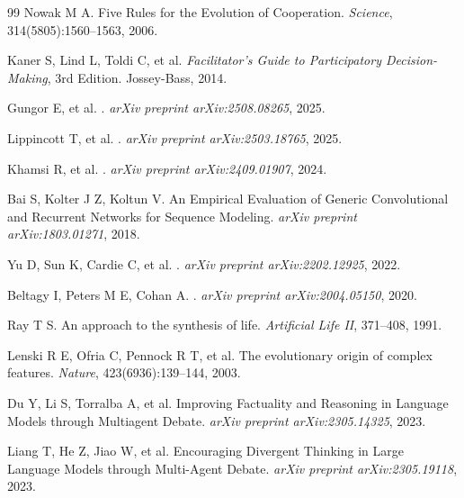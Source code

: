 \documentclass[12pt,a4paper]{ctexart}
\begin{document}
\begin{thebibliography}{99}
Nowak M A.
\newblock Five Rules for the Evolution of Cooperation.
\newblock \emph{Science}, 314(5805):1560--1563, 2006.

Kaner S, Lind L, Toldi C, et al.
\newblock \emph{Facilitator's Guide to Participatory Decision-Making}, 3rd Edition.
\newblock Jossey-Bass, 2014.

Gungor E, et al.
.
\newblock \emph{arXiv preprint arXiv:2508.08265}, 2025.

Lippincott T, et al.
.
\newblock \emph{arXiv preprint arXiv:2503.18765}, 2025.

Khamsi R, et al.
.
\newblock \emph{arXiv preprint arXiv:2409.01907}, 2024.

Bai S, Kolter J Z, Koltun V.
\newblock An Empirical Evaluation of Generic Convolutional and Recurrent Networks for Sequence Modeling.
\newblock \emph{arXiv preprint arXiv:1803.01271}, 2018.

Yu D, Sun K, Cardie C, et al.
.
\newblock \emph{arXiv preprint arXiv:2202.12925}, 2022.

Beltagy I, Peters M E, Cohan A.
.
\newblock \emph{arXiv preprint arXiv:2004.05150}, 2020.

Ray T S.
\newblock An approach to the synthesis of life.
\newblock \emph{Artificial Life II}, 371--408, 1991.

Lenski R E, Ofria C, Pennock R T, et al.
\newblock The evolutionary origin of complex features.
\newblock \emph{Nature}, 423(6936):139--144, 2003.

Du Y, Li S, Torralba A, et al.
\newblock Improving Factuality and Reasoning in Language Models through Multiagent Debate.
\newblock \emph{arXiv preprint arXiv:2305.14325}, 2023.

Liang T, He Z, Jiao W, et al.
\newblock Encouraging Divergent Thinking in Large Language Models through Multi-Agent Debate.
\newblock \emph{arXiv preprint arXiv:2305.19118}, 2023.


\end{thebibliography}
\end{document}
